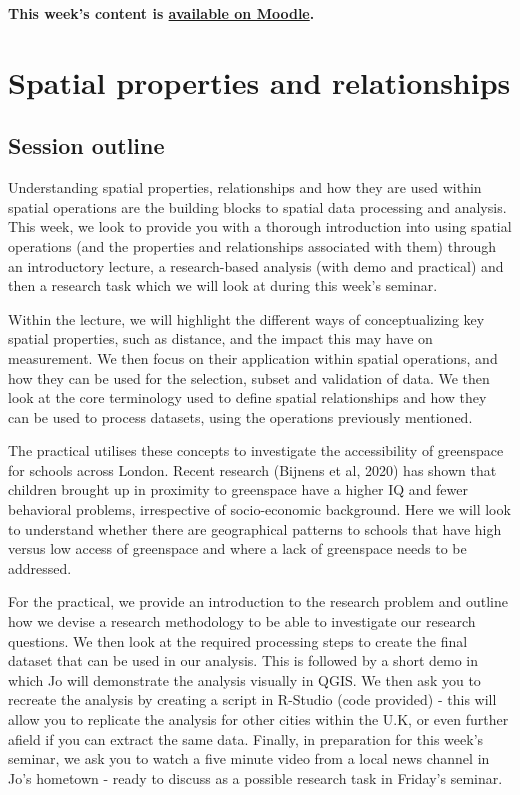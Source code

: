 \documentclass[
]{book}
\begin{document}
\textbf{This week's content is \href{https://moodle.ucl.ac.uk/}{available on Moodle}.}

\hypertarget{spatial-properties-and-relationships}{%
\chapter{Spatial properties and relationships}\label{spatial-properties-and-relationships}}

\hypertarget{session-outline}{%
\section{Session outline}\label{session-outline}}

Understanding spatial properties, relationships and how they are used within spatial operations are the building blocks to spatial data processing and analysis. This week, we look to provide you with a thorough introduction into using spatial operations (and the properties and relationships associated with them) through an introductory lecture, a research-based analysis (with demo and practical) and then a research task which we will look at during this week's seminar.

Within the lecture, we will highlight the different ways of conceptualizing key spatial properties, such as distance, and the impact this may have on measurement. We then focus on their application within spatial operations, and how they can be used for the selection, subset and validation of data. We then look at the core terminology used to define spatial relationships and how they can be used to process datasets, using the operations previously mentioned.

The practical utilises these concepts to investigate the accessibility of greenspace for schools across London. Recent research (Bijnens et al, 2020) has shown that children brought up in proximity to greenspace have a higher IQ and fewer behavioral problems, irrespective of socio-economic background. Here we will look to understand whether there are geographical patterns to schools that have high versus low access of greenspace and where a lack of greenspace needs to be addressed.

For the practical, we provide an introduction to the research problem and outline how we devise a research methodology to be able to investigate our research questions. We then look at the required processing steps to create the final dataset that can be used in our analysis. This is followed by a short demo in which Jo will demonstrate the analysis visually in QGIS. We then ask you to recreate the analysis by creating a script in R-Studio (code provided) - this will allow you to replicate the analysis for other cities within the U.K, or even further afield if you can extract the same data. Finally, in preparation for this week's seminar, we ask you to watch a five minute video from a local news channel in Jo's hometown - ready to discuss as a possible research task in Friday's seminar.
\end{document}
